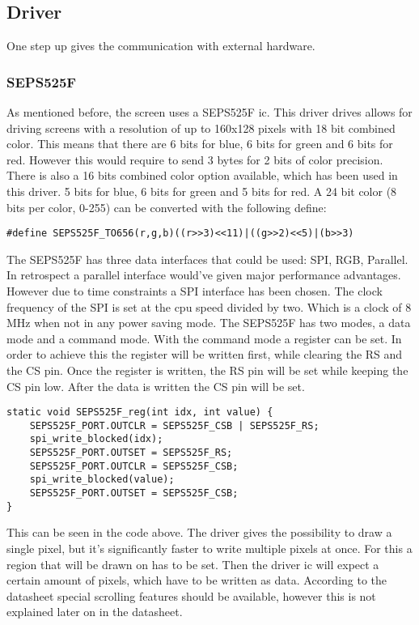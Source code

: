 \subsection{Driver}
One step up gives the communication with external hardware.
\subsubsection{SEPS525F}
As mentioned before, the screen uses a SEPS525F ic. This driver drives allows for driving screens with a resolution of up to 160x128 pixels with 18 bit combined color. This means that there are 6 bits for blue, 6 bits for green and 6 bits for red. However this would require to send 3 bytes for 2 bits of color precision. There is also a 16 bits combined color option available, which has been used in this driver. 5 bits for blue, 6 bits for green and 5 bits for red. A 24 bit color (8 bits per color, 0-255) can be converted with the following define:
\begin{verbatim}
#define SEPS525F_TO656(r,g,b)((r>>3)<<11)|((g>>2)<<5)|(b>>3)
\end{verbatim}
The SEPS525F has three data interfaces that could be used: SPI, RGB, Parallel. In retrospect a parallel interface would've given major performance advantages. However due to time constraints a SPI interface has been chosen. The clock frequency of the SPI is set at the cpu speed divided by two. Which is a clock of 8 MHz when not in any power saving mode.\newpar
The SEPS525F has two modes, a data mode and a command mode. With the command mode a register can be set. In order to achieve this the register will be written first, while clearing the RS and the CS pin. Once the register is written, the RS pin will be set while keeping the CS pin low. After the data is written the CS pin will be set.
\begin{verbatim}
static void SEPS525F_reg(int idx, int value) {
	SEPS525F_PORT.OUTCLR = SEPS525F_CSB | SEPS525F_RS;
	spi_write_blocked(idx);
	SEPS525F_PORT.OUTSET = SEPS525F_RS;
	SEPS525F_PORT.OUTCLR = SEPS525F_CSB;
	spi_write_blocked(value);
	SEPS525F_PORT.OUTSET = SEPS525F_CSB;
}
\end{verbatim}
This can be seen in the code above. The driver gives the possibility to draw a single pixel, but it's significantly faster to write multiple pixels at once. For this a region that will be drawn on has to be set. Then the driver ic will expect a certain amount of pixels, which have to be written as data. According to the datasheet special scrolling features should be available, however this is not explained later on in the datasheet.